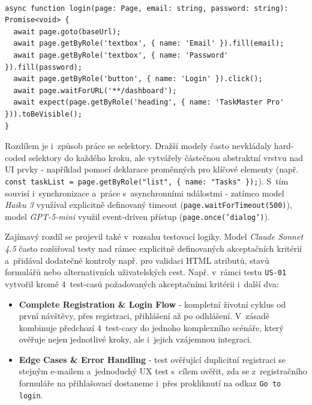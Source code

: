 \documentclass[czech, ing, kiv, he, iso690numb, viewonly]{fasthesis}
\begin{document}
\begin{lstlisting}[style=tscode, 
    caption={\protect\centering Ukázka sdíleného kódu pro přihlášení vygenerovaného modelem GPT-5.}, 
    label={testing:shared-functionality},
    basicstyle=\ttfamily\scriptsize,
    float=false]

async function login(page: Page, email: string, password: string): Promise<void> {
  await page.goto(baseUrl);
  await page.getByRole('textbox', { name: 'Email' }).fill(email);
  await page.getByRole('textbox', { name: 'Password' }).fill(password);
  await page.getByRole('button', { name: 'Login' }).click();
  await page.waitForURL('**/dashboard');
  await expect(page.getByRole('heading', { name: 'TaskMaster Pro' })).toBeVisible();
}
\end{lstlisting}

Rozdílem je i~způsob práce se selektory. Dražší modely často nevkládaly 
hard-coded selektory do každého kroku, ale vytvářely částečnou abstraktní vrstvu nad UI prvky 
- například pomocí deklarace proměnných pro klíčové elementy (např. \texttt{const taskList = page.getByRole("list", \{ name: "Tasks" \});}).
S~tím souvisí i~synchronizace a~práce s~asynchronními událostmi - zatímco model \textit{Haiku 3}
využíval explicitně definovaný timeout (\texttt{page.waitForTimeout(500)}), model \textit{GPT-5-mini} 
využil event-driven přístup (\texttt{page.once('dialog')}).

Zajímavý rozdíl se projevil také v~rozsahu testovací logiky. Model \textit{Claude Sonnet 4.5} často
rozšiřoval testy nad rámec explicitně definovaných akceptačních kritérií a~přidával dodatečné kontroly
např. pro validaci HTML atributů, stavů formulářů nebo alternativních uživatelských cest.
Např. v~rámci testu \texttt{US-01} vytvořil kromě 4~test-casů požadovaných akceptačními kritérii 
i~další dva:
\begin{itemize}
    \item \textbf{Complete Registration \& Login Flow} - kompletní životní cyklus od první návštěvy,
    přes registraci, přihlášení až po odhlášení. V~zásadě kombinuje předchozí 4~test-casy 
    do jednoho komplexního scénáře, který ověřuje nejen jednotlivé kroky, ale i~jejich vzájemnou integraci.
    \item \textbf{Edge Cases \& Error Handling} - test ověřující duplicitní registraci se stejným e-mailem a~jednoduchý UX test s~cílem ověřit, zda se z~registračního formuláře na přihlašovací dostaneme i~přes 
    prokliknutí na odkaz \texttt{Go to login}.
\end{itemize}
\end{document}

